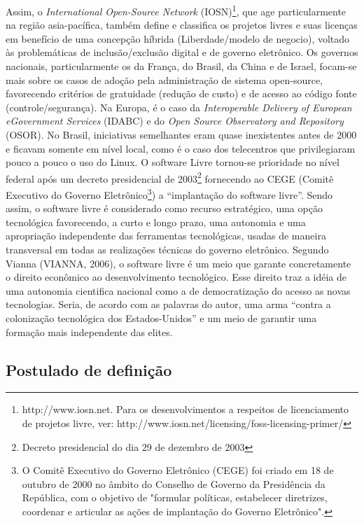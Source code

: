 Assim, o \emph{International Open-Source Network} (IOSN)\footnote{http://www.iosn.net. Para os desenvolvimentos a respeitos de licenciamento de projetos livre, ver: http://www.iosn.net/licensing/foss-licensing-primer/}, que age particularmente na região asia-pacífica, também define e classifica os projetos livres e suas licenças em benefício de uma concepção híbrida (Liberdade/modelo de negocio), voltado às problemáticas de inclusão/exclusão digital e de governo eletrônico. Os governos nacionais, particularmente os da França, do Brasil, da China e de Israel, focam-se mais sobre os casos de adoção pela administração de sistema open-source, favorecendo critérios de gratuidade (redução de custo) e de acesso ao código fonte (controle/segurança). Na Europa, é o caso da \emph{Interoperable Delivery of European eGovernment Services} (IDABC) e do \emph{Open Source Observatory and Repository} (OSOR). No Brasil, iniciativas semelhantes eram quase inexistentes antes de 2000 e ficavam somente em nível local, como é o caso dos telecentros que privilegiaram pouco a pouco o uso do Linux. O software Livre tornou-se prioridade no nível federal após um decreto presidencial de 2003\footnote{Decreto presidencial do dia 29 de dezembro de 2003} fornecendo ao CEGE (Comitê Executivo do Governo Eletrônico\footnote{O Comitê Executivo do Governo Eletrônico (CEGE) foi criado em 18 de outubro de 2000 no âmbito do Conselho de Governo da Presidência da República, com o objetivo de "formular políticas, estabelecer diretrizes, coordenar e articular as ações de implantação do Governo Eletrônico".}) a “implantação do software livre”. Sendo assim, o software livre é considerado como recurso estratégico, uma opção tecnológica favorecendo, a curto e longo prazo, uma autonomia e uma apropriação independente das ferramentas tecnológicas, usadas de maneira transversal em todas as realizações técnicas do governo eletrônico. Segundo Vianna (VIANNA, 2006), o software livre é um meio que garante concretamente o direito econômico ao desenvolvimento tecnológico. Esse direito traz a idéia de uma autonomia cientifica nacional como a de democratização do acesso as novas tecnologias. Seria, de acordo com as palavras do autor, uma arma “contra a colonização tecnológica dos Estados-Unidos” e um meio de garantir uma formação mais independente das elites. 

\subsection{Postulado de definição} \label{1.3.4}

